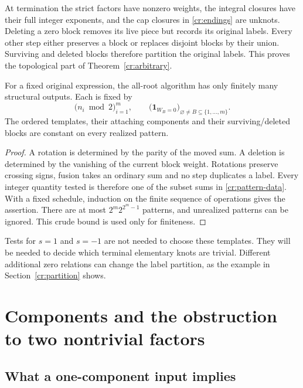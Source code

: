 At termination the strict factors have nonzero weights, the integral closures have their full integer exponents, and the cap closures in \eqref{cr:endings} are unknots. Deleting a zero block removes its live piece but records its original labels. Every other step either preserves a block or replaces disjoint blocks by their union. Surviving and deleted blocks therefore partition the original labels. This proves the topological part of Theorem~\ref{cr:arbitrary}.

\begin{proposition}\label{cr:patterns}
For a fixed original expression, the all-root algorithm has only finitely many structural outputs. Each is fixed by
\begin{equation}\label{cr:pattern-data}
 \bigl(n_i\bmod2\bigr)_{i=1}^m,\qquad
 \bigl(\mathbf1_{W_B=0}\bigr)_{\varnothing\ne B\subseteq\{1,\ldots,m\}}.
\end{equation}
The ordered templates, their attaching components and their surviving/deleted blocks are constant on every realized pattern.
\end{proposition}
\begin{proof}
A rotation is determined by the parity of the moved sum. A deletion is determined by the vanishing of the current block weight. Rotations preserve crossing signs, fusion takes an ordinary sum and no step duplicates a label. Every integer quantity tested is therefore one of the subset sums in \eqref{cr:pattern-data}. With a fixed schedule, induction on the finite sequence of operations gives the assertion. There are at most $2^m2^{2^m-1}$ patterns, and unrealized patterns can be ignored. This crude bound is used only for finiteness.
\end{proof}

Tests for $s=1$ and $s=-1$ are not needed to choose these templates. They will be needed to decide which terminal elementary knots are trivial. Different additional zero relations can change the label partition, as the example in Section~\ref{cr:partition} shows.

\section{Components and the obstruction to two nontrivial factors}\label{cr:groups}

\subsection{What a one-component input implies}

